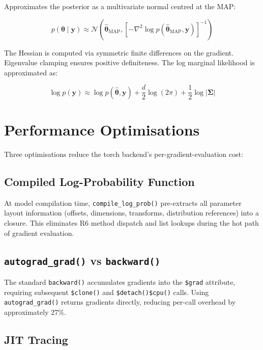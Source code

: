 \documentclass[
  11pt,
]{article}
\begin{document}
Approximates the posterior as a multivariate normal centred at the MAP:

\[p(\boldsymbol\theta \mid \mathbf{y}) \approx \mathcal{N}\left(\hat{\boldsymbol\theta}_{\text{MAP}}, \left[-\nabla^2 \log p(\hat{\boldsymbol\theta}_{\text{MAP}}, \mathbf{y})\right]^{-1}\right)\]

The Hessian is computed via symmetric finite differences on the
gradient. Eigenvalue clamping ensures positive definiteness. The log
marginal likelihood is approximated as:

\[\log p(\mathbf{y}) \approx \log p(\hat{\boldsymbol\theta}, \mathbf{y}) + \frac{d}{2}\log(2\pi) + \frac{1}{2}\log|\boldsymbol\Sigma|\]

\section{Performance Optimisations}\label{performance-optimisations}

Three optimisations reduce the torch backend's per-gradient-evaluation
cost:

\subsection{Compiled Log-Probability
Function}\label{compiled-log-probability-function}

At model compilation time, \texttt{compile\_log\_prob()} pre-extracts
all parameter layout information (offsets, dimensions, transforms,
distribution references) into a closure. This eliminates R6 method
dispatch and list lookups during the hot path of gradient evaluation.

\subsection{\texorpdfstring{\texttt{autograd\_grad()} vs
\texttt{backward()}}{autograd\_grad() vs backward()}}\label{autograd_grad-vs-backward}

The standard \texttt{backward()} accumulates gradients into the
\texttt{\$grad} attribute, requiring subsequent \texttt{\$clone()} and
\texttt{\$detach()\$cpu()} calls. Using \texttt{autograd\_grad()}
returns gradients directly, reducing per-call overhead by approximately
27\%.

\subsection{JIT Tracing}\label{jit-tracing}
\end{document}
